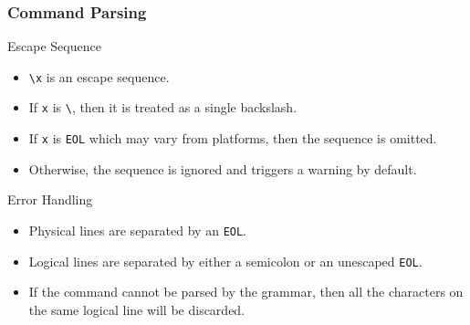 \documentclass[10pt]{beamer}
\begin{document}
\begin{frame}[t] \frametitle{Command Parsing}

	\begin{block}{Escape Sequence}
		\begin{itemize}
			\item \texttt{\textbackslash x} is an escape sequence.
			\item If \texttt{x} is \texttt{\textbackslash}, then it is treated as a single backslash.
			\item If \texttt{x} is \texttt{EOL} which may vary from platforms, then the sequence is omitted.
			\item Otherwise, the sequence is ignored and triggers a warning by default.
		\end{itemize}
	\end{block}

	\begin{block}{Error Handling}
		\begin{itemize}
			\item Physical lines are separated by an \texttt{EOL}.
			\item Logical lines are separated by either a semicolon or an unescaped \texttt{EOL}.
			\item If the command cannot be parsed by the grammar, then all the characters on the same logical line will be discarded.
		\end{itemize}
	\end{block}

\end{frame}
\end{document}

